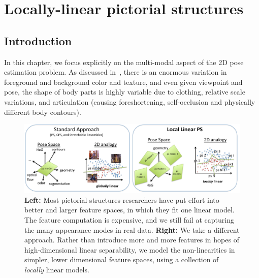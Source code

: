 \chapter{Locally-linear pictorial structures}\label{sec:llps}
\section{Introduction}


In this chapter, we focus explicitly on the multi-modal aspect of the 2D pose 
estimation problem.  As discussed in~, there is an enormous 
variation in foreground and background color and texture, and even given 
viewpoint and pose, the shape of body parts is highly variable due to clothing, 
relative scale variations, and articulation (causing foreshortening, 
self-occlusion and physically different body contours).

\begin{figure}[t!]
\centering
\includegraphics[width=0.99\linewidth]{figs/llps-overview.pdf}
\caption[LLPS overview.]{\label{fig:overview} \textbf{Left:} Most pictorial 
structures researchers have put effort into better and larger feature spaces, 
in which they fit one linear model.  The feature computation is expensive, and 
we still fail at capturing the many appearance modes in real data.  
\textbf{Right:} We take a different approach.  Rather than introduce more and 
more features in hopes of high-dimensional linear separability, we model the 
non-linearities in simpler, lower dimensional feature spaces, using a 
collection of {\em locally} linear models.}
\end{figure}


